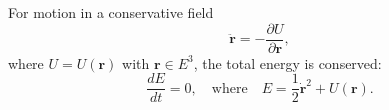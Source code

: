 For motion in a conservative field
$$\ddot{\mathbf{r}} = -\frac{\partial U}{\partial \mathbf{r}},$$
where $U = U(\mathbf{r})$ with $\mathbf{r} \in E^3$, the total energy is conserved:
$$\frac{dE}{dt} = 0, \quad \text{where} \quad E = \frac{1}{2}\dot{\mathbf{r}}^2 + U(\mathbf{r}).$$
